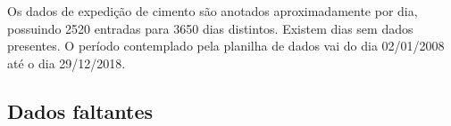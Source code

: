 \begin{table}[]
\caption{Variáveis presentes nos dados de expedição de cimento cedidos pela Intercement}
\label{tb:vars}
\end{table}

Os dados de expedição de cimento são anotados aproximadamente por dia, possuindo 2520
entradas para 3650 dias distintos. Existem dias sem dados presentes. O
período contemplado pela planilha de dados vai do dia 02/01/2008 até o dia 29/12/2018.

\subsection{Dados faltantes}

